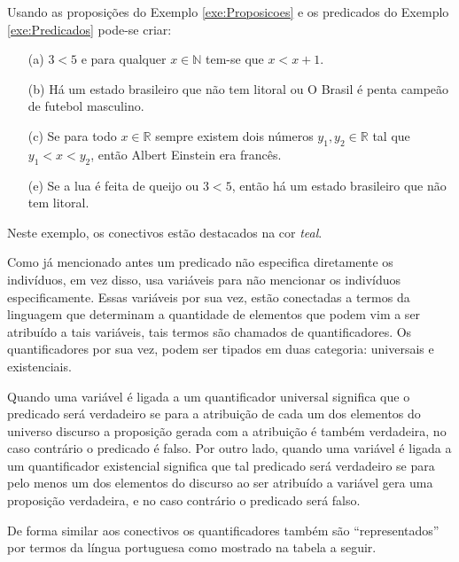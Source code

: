 \begin{exemplo}\label{exe:Conectivos}
	Usando as proposições do Exemplo \ref{exe:Proposicoes} e os predicados do Exemplo \ref{exe:Predicados} pode-se criar:
	\begin{itemize}
		\item[(a)] $3 < 5$ {\color{teal}e} para qualquer $x \in\mathbb{N}$ tem-se que $x < x + 1$.
		\item[(b)] Há um estado brasileiro que não tem litoral {\color{teal}ou} O Brasil é penta campeão de futebol masculino.
		\item[(c)] {\color{teal}Se} para todo $x \in \mathbb{R}$ sempre existem dois números $y_1, y_2 \in \mathbb{R}$ tal que $y_1 < x < y_2$, {\color{teal}então} Albert Einstein era francês.
		\item[(e)] {\color{teal}Se} a lua é feita de queijo {\color{teal}ou} $3 < 5$, {\color{teal}então} há um estado brasileiro que não tem litoral.
	\end{itemize}
  Neste exemplo, os conectivos estão destacados na cor \textit{{\color{teal} teal}}.
\end{exemplo}

Como já mencionado antes um predicado não especifica diretamente os indivíduos, em vez disso, usa variáveis para não mencionar os indivíduos especificamente. Essas variáveis por sua vez, estão conectadas a termos da linguagem que determinam a quantidade de elementos que podem vim a ser atribuído a tais variáveis, tais termos são chamados de quantificadores. Os quantificadores por sua vez, podem ser tipados em duas categoria: universais e existenciais. 

Quando uma variável é ligada a um quantificador universal significa que o predicado será verdadeiro se para a atribuição de cada um  dos elementos do universo discurso a proposição gerada com a atribuição é também verdadeira, no caso contrário o predicado é falso. Por outro lado, quando uma variável é ligada a um quantificador existencial significa que tal predicado será verdadeiro se para pelo menos um dos elementos do discurso ao ser atribuído a variável gera uma proposição verdadeira, e no caso contrário o predicado será falso.

De forma similar aos conectivos os quantificadores também são ``representados'' por termos da língua portuguesa como mostrado na tabela a seguir.

